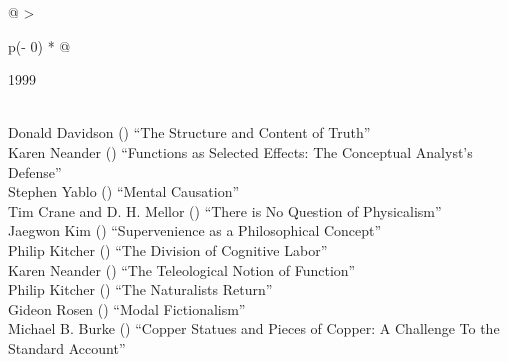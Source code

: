 \documentclass[
  10pt,
  letterpaper,
  DIV=11,
  numbers=noendperiod,
  twoside]{scrartcl}
\begin{document}
\begin{longtable}[]{@{}
  >{\raggedright\arraybackslash}p{(\columnwidth - 0\tabcolsep) * }@{}}

\caption{\label{tbl-top-ten-1990}Most cited articles published less than
ten years ago as of 1999.}

\tabularnewline

\toprule\noalign{}
\begin{minipage}[b]{\linewidth}\raggedright
1999
\end{minipage} \\
\midrule\noalign{}
\endhead
\bottomrule\noalign{}
\endlastfoot
Donald Davidson
()
``The Structure and Content of Truth'' \\
Karen Neander
()
``Functions as Selected Effects: The Conceptual Analyst's Defense'' \\
Stephen Yablo
()
``Mental Causation'' \\
Tim Crane and D. H. Mellor
()
``There is No Question of Physicalism'' \\
Jaegwon Kim
()
``Supervenience as a Philosophical Concept'' \\
Philip Kitcher
()
``The Division of Cognitive Labor'' \\
Karen Neander
()
``The Teleological Notion of Function'' \\
Philip Kitcher
()
``The Naturalists Return'' \\
Gideon Rosen
()
``Modal Fictionalism'' \\
Michael B. Burke
()
``Copper Statues and Pieces of Copper: A Challenge To the Standard
Account'' \\

\end{longtable}
\end{document}
